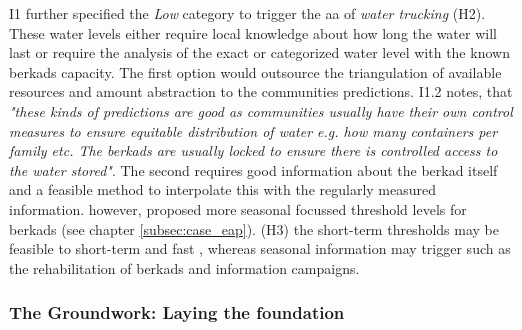 I1 further specified the \textit{Low} category to trigger the \acrshort{aa} of \textit{water trucking} (H2). These water levels either require local knowledge about how long the water will last or require the analysis of the exact or categorized water level with the known berkads capacity. The first option would outsource the triangulation of available resources and amount abstraction to the communities predictions. I1.2 notes, that \textit{"these kinds of predictions are good as communities usually have their own control measures to ensure equitable distribution of water e.g. how many containers per family etc. The berkads are usually locked to ensure there is controlled access to the water stored"}. The second requires good information about the berkad itself and a feasible method to interpolate this with the regularly measured information. \autocite{gualazziniEWEAEarlyWarning2021} however, proposed more seasonal focussed threshold levels for berkads (see chapter \ref*{subsec:case_eap}). (H3) the short-term thresholds may be feasible to short-term and fast , whereas seasonal information may trigger  such as the rehabilitation of berkads and information campaigns.

\subsubsection*{The Groundwork: Laying the foundation}\label{subsubsec:groundwork_appl}

